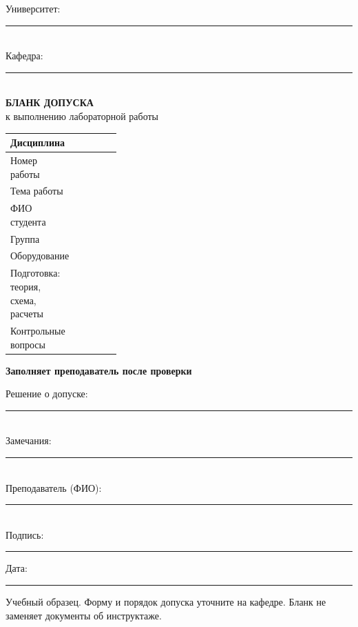 \documentclass[a4paper,14pt]{extarticle}
\newcommand{\blank}{\rule{0pt}{10mm}}
\begin{document}
\begin{center}
    Университет: \rule{9cm}{0.4pt}\\[6pt]
    Кафедра: \rule{10cm}{0.4pt}\\[14pt]
    \textbf{БЛАНК ДОПУСКА}\\[4pt]
    к выполнению лабораторной работы
\end{center}
\medskip
\begin{tabularx}{\linewidth}{|>{\raggedright\arraybackslash}p{0.32\linewidth}|X|}
    \hline
    Дисциплина & \blank \\ \hline
    Номер работы & \blank \\ \hline
    Тема работы & \rule{0pt}{14mm} \\ \hline
    ФИО студента & \blank \\ \hline
    Группа & \blank \\ \hline
    Оборудование & \rule{0pt}{14mm} \\ \hline
    Подготовка: теория, схема, расчеты & \rule{0pt}{18mm} \\ \hline
    Контрольные вопросы & \rule{0pt}{18mm} \\ \hline
\end{tabularx}\par
\vspace{6mm}

\textbf{Заполняет преподаватель после проверки}\par
\vspace{4mm}

Решение о допуске: \rule{8cm}{0.4pt}\\[10pt]
Замечания: \rule{11cm}{0.4pt}\\[10pt]
Преподаватель (ФИО): \rule{8cm}{0.4pt}\\[10pt]
Подпись: \rule{4cm}{0.4pt}\hfill Дата: \rule{4cm}{0.4pt}

\medskip
{\small Учебный образец. Форму и порядок допуска уточните на кафедре.
Бланк не заменяет документы об инструктаже.}
\end{document}
